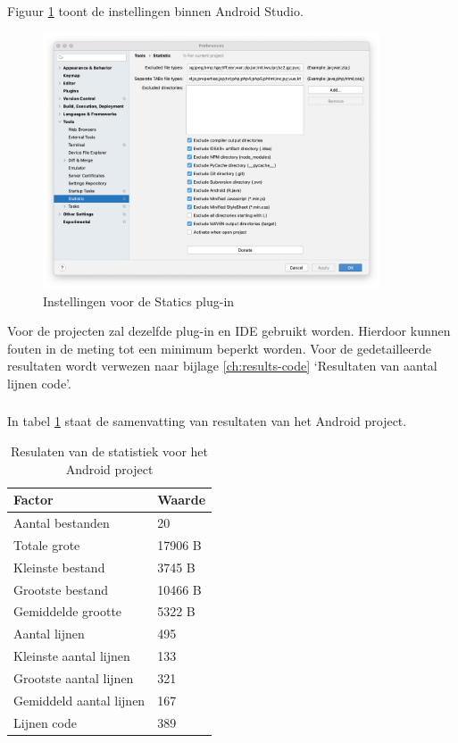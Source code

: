 Figuur \ref{fig:M-test-lijnen-code-settings} toont de instellingen binnen Android Studio.
\begin{figure}[h!]
    \centering
    \includegraphics[width=10cm]{img/statistics-settings.png}
    \caption{Instellingen voor de Statics plug-in}
    \label{fig:M-test-lijnen-code-settings}
\end{figure}


Voor de projecten zal dezelfde plug-in en IDE gebruikt worden. Hierdoor kunnen fouten in de meting tot een minimum beperkt worden. Voor de gedetailleerde resultaten wordt verwezen naar bijlage \ref{ch:results-code} `Resultaten van aantal lijnen code'.

\subsubsection{}
\label{sec:M-test-lijnen-code-android}
In tabel \ref{T:lines-android} staat de samenvatting van resultaten van het Android project. 

\begin{table}[H]
    \centering
    \caption{Resulaten van de statistiek voor het Android project}
    \begin{tabular}{|l|l|}
        \hline
        {\textbf{Factor}} & {\textbf{Waarde}} \\ \hline \hline
        Aantal bestanden&20\\ \hline
        Totale grote&17906 B\\ \hline
        Kleinste bestand&3745 B\\ \hline
        Grootste bestand&10466 B\\ \hline
        Gemiddelde grootte&5322 B\\ \hline
        Aantal lijnen&495\\ \hline
        Kleinste aantal lijnen&133\\ \hline
        Grootste aantal lijnen&321\\ \hline
        Gemiddeld aantal lijnen&167\\ \hline
        Lijnen code&389\\ \hline
    \end{tabular}
    \label{T:lines-android}
\end{table}

